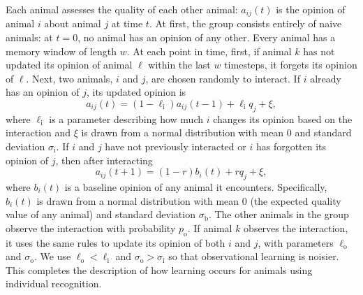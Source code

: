 Each animal assesses the quality of each other animal: $a_{ij}(t)$ is the opinion of animal $i$ about animal $j$ at time $t$.  At first, the group consists entirely of naive animals: at $t=0$, no animal has an opinion of any other. Every animal has a memory window of length $w$. At each point in time, first, if animal $k$ has not updated its opinion of animal $\ell$ within the last $w$ timesteps, it forgets its opinion of $\ell$. Next, two animals, $i$ and $j$, are chosen randomly to interact. If $i$ already has an opinion of $j$, its updated opinion is 
\begin{equation*}
a_{ij}(t)=(1-\ell_\text{i})a_{ij}(t-1)+\ell_\text{i} q_j+\xi,
\end{equation*}
where $\ell_\text{i}$ is a parameter describing how much $i$ changes its opinion based on the interaction and $\xi$ is drawn from a normal distribution with mean $0$ and standard deviation $\sigma_\text{i}$. If $i$ and $j$ have not previously interacted or $i$ has forgotten its opinion of $j$, then after interacting 
\begin{equation*}
a_{ij}(t+1)=(1-r)b_{i}(t)+rq_j+\xi,
\end{equation*}
where $b_i(t)$ is a baseline opinion of any animal it encounters. Specifically, $b_i(t)$ is drawn from a normal distribution with mean $0$ (the expected quality value of any animal) and standard deviation $\sigma_\text{b}$. The other animals in the group observe the interaction with probability $p_\text{o}$. If animal $k$ observes the interaction, it uses the same rules to update its opinion of both $i$ and $j$, with parameters $\ell_\text{o}$ and $\sigma_\text{o}$. We use $\ell_\text{o}<\ell_\text{i}$ and $\sigma_\text{o}>\sigma_\text{i}$ so that observational learning is noisier. This completes the description of how learning occurs for animals using individual recognition. 

